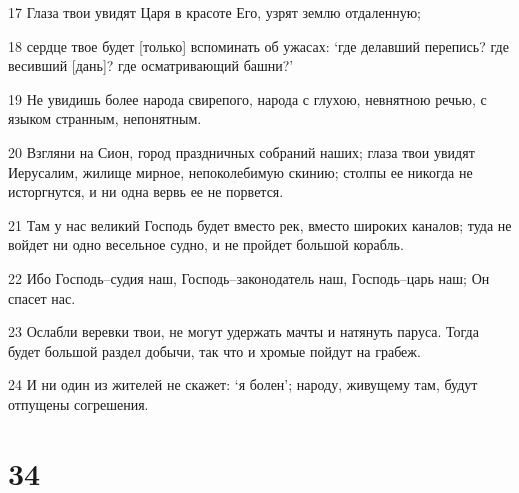 \par 17 Глаза твои увидят Царя в красоте Его, узрят землю отдаленную;
\par 18 сердце твое будет [только] вспоминать об ужасах: `где делавший перепись? где весивший [дань]? где осматривающий башни?'
\par 19 Не увидишь более народа свирепого, народа с глухою, невнятною речью, с языком странным, непонятным.
\par 20 Взгляни на Сион, город праздничных собраний наших; глаза твои увидят Иерусалим, жилище мирное, непоколебимую скинию; столпы ее никогда не исторгнутся, и ни одна вервь ее не порвется.
\par 21 Там у нас великий Господь будет вместо рек, вместо широких каналов; туда не войдет ни одно весельное судно, и не пройдет большой корабль.
\par 22 Ибо Господь--судия наш, Господь--законодатель наш, Господь--царь наш; Он спасет нас.
\par 23 Ослабли веревки твои, не могут удержать мачты и натянуть паруса. Тогда будет большой раздел добычи, так что и хромые пойдут на грабеж.
\par 24 И ни один из жителей не скажет: `я болен'; народу, живущему там, будут отпущены согрешения.

\chapter{34}

